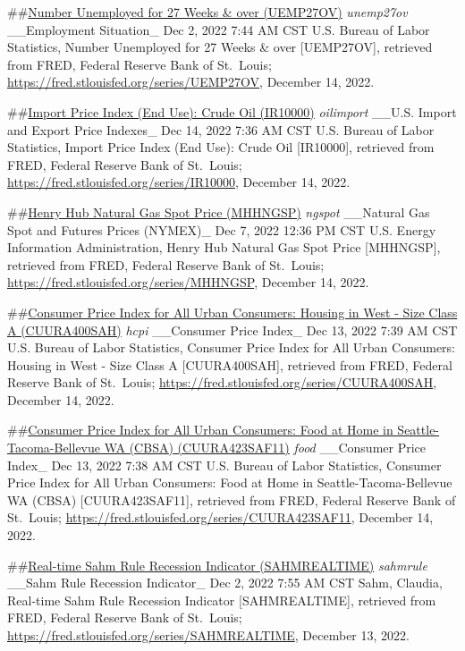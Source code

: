 \documentclass[
]{article}
\begin{document}
\#\#\href{https://fred.stlouisfed.org/series/UEMP27OV}{Number Unemployed
for 27 Weeks \& over (UEMP27OV)} \emph{unemp27ov} \_\_Employment
Situation\_ Dec 2, 2022 7:44 AM CST U.S. Bureau of Labor Statistics,
Number Unemployed for 27 Weeks \& over {[}UEMP27OV{]}, retrieved from
FRED, Federal Reserve Bank of St.~Louis;
\url{https://fred.stlouisfed.org/series/UEMP27OV}, December 14, 2022.

\#\#\href{https://fred.stlouisfed.org/series/IR10000}{Import Price Index
(End Use): Crude Oil (IR10000)} \emph{oilimport} \_\_U.S. Import and
Export Price Indexes\_ Dec 14, 2022 7:36 AM CST U.S. Bureau of Labor
Statistics, Import Price Index (End Use): Crude Oil {[}IR10000{]},
retrieved from FRED, Federal Reserve Bank of St.~Louis;
\url{https://fred.stlouisfed.org/series/IR10000}, December 14, 2022.

\#\#\href{https://fred.stlouisfed.org/series/MHHNGSP}{Henry Hub Natural
Gas Spot Price (MHHNGSP)} \emph{ngspot} \_\_Natural Gas Spot and Futures
Prices (NYMEX)\_ Dec 7, 2022 12:36 PM CST U.S. Energy Information
Administration, Henry Hub Natural Gas Spot Price {[}MHHNGSP{]},
retrieved from FRED, Federal Reserve Bank of St.~Louis;
\url{https://fred.stlouisfed.org/series/MHHNGSP}, December 14, 2022.

\#\#\href{https://fred.stlouisfed.org/series/CUURA400SAH}{Consumer Price
Index for All Urban Consumers: Housing in West - Size Class A
(CUURA400SAH)} \emph{hcpi} \_\_Consumer Price Index\_ Dec 13, 2022 7:39
AM CST U.S. Bureau of Labor Statistics, Consumer Price Index for All
Urban Consumers: Housing in West - Size Class A {[}CUURA400SAH{]},
retrieved from FRED, Federal Reserve Bank of St.~Louis;
\url{https://fred.stlouisfed.org/series/CUURA400SAH}, December 14, 2022.

\#\#\href{https://fred.stlouisfed.org/series/CUURA423SAF11}{Consumer
Price Index for All Urban Consumers: Food at Home in
Seattle-Tacoma-Bellevue WA (CBSA) (CUURA423SAF11)} \emph{food}
\_\_Consumer Price Index\_ Dec 13, 2022 7:38 AM CST U.S. Bureau of Labor
Statistics, Consumer Price Index for All Urban Consumers: Food at Home
in Seattle-Tacoma-Bellevue WA (CBSA) {[}CUURA423SAF11{]}, retrieved from
FRED, Federal Reserve Bank of St.~Louis;
\url{https://fred.stlouisfed.org/series/CUURA423SAF11}, December 14,
2022.

\#\#\href{https://fred.stlouisfed.org/series/SAHMREALTIME}{Real-time
Sahm Rule Recession Indicator (SAHMREALTIME)} \emph{sahmrule} \_\_Sahm
Rule Recession Indicator\_ Dec 2, 2022 7:55 AM CST Sahm, Claudia,
Real-time Sahm Rule Recession Indicator {[}SAHMREALTIME{]}, retrieved
from FRED, Federal Reserve Bank of St.~Louis;
\url{https://fred.stlouisfed.org/series/SAHMREALTIME}, December 13,
2022.
\end{document}
